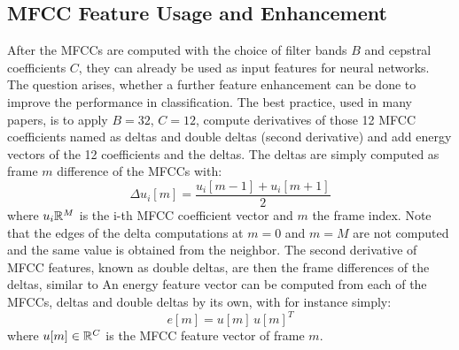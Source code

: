 
\subsection{MFCC Feature Usage and Enhancement}\label{sec:signal_mfcc_enhancement}
After the MFCCs are computed with the choice of filter bands $B$ and cepstral coefficients $C$, they can already be used as input features for neural networks.
The question arises, whether a further feature enhancement can be done to improve the performance in classification.
The best practice, used in many papers, is to apply $B=32$, $C=12$, compute derivatives of those 12 MFCC coefficients named as deltas and double deltas (second derivative) and add energy vectors of the 12 coefficients and the deltas.
The deltas are simply computed as frame $m$ difference of the MFCCs with:
\begin{equation}\label{eq:signal_mfcc_delta}
  \Delta u_i[m] = \frac{u_i[m - 1] + u_i[m + 1]}{2}
\end{equation}
where $u_i \mathbb{R}^M$ is the i-th MFCC coefficient vector and $m$ the frame index.
Note that the edges of the delta computations at $m=0$ and $m=M$ are not computed and the same value is obtained from the neighbor.
The second derivative of MFCC features, known as double deltas, are then the frame differences of the deltas, similar to 
An energy feature vector can be computed from each of the MFCCs, deltas and double deltas by its own, with for instance simply:
\begin{equation}
  e[m] = u[m] \, u[m]^T 
\end{equation}
where $u[m] \in \mathbb{R}^C$ is the MFCC feature vector of frame $m$.

